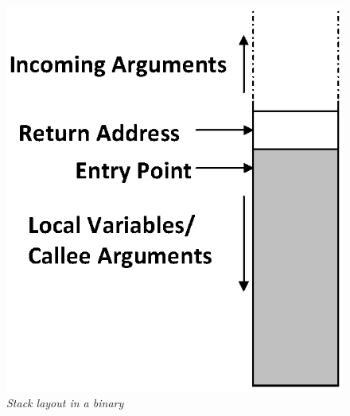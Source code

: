 \begin{figure}[t]
\vspace{-0.5in}
\centering
\includegraphics [width=0.2\linewidth] {figures/EPS/stackLayout.eps} 
\tiny{
\caption { \textit{Stack layout in a binary}}
}
\label{fig:stack-layout}
\end{figure}
